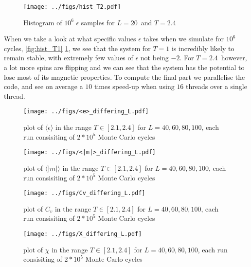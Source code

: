 \documentclass[english,notitlepage,reprint,nofootinbib]{revtex4-1}  %
\begin{document}
\begin{figure}[H]
	\centering
	\texttt{[image: ../figs/hist\_T2.pdf]} %
	\caption{Histogram of $10^6$ $\epsilon$ samples for $L=20$ and $T=2.4$}
	\label{fig:hist_T2}
\end{figure}

When we take a look at what specific values $\epsilon$ takes when we simulate for $10^6$ cycles, \ref{fig:hist_T1} \ref{fig:hist_T2}, we see that the system for $T=1$ is incredibly likely to remain stable, with extremely few values of $\epsilon$ not being $-2$. For $T=2.4$ however, a lot more spins are flipping and we can see that the system has the potential to lose most of its magnetic properties.
\newline
To compute the final part we parallelise the code, and see on average a $10$ times speed-up when using $16$ threads over a single thread.
\begin{figure}[H]
	\centering
	\texttt{[image: ../figs/<e>\_differing\_L.pdf]} %
	\caption{plot of $\langle\epsilon\rangle$ in the range $T \in [2.1,2.4]$ for $L=40,60,80,100$, each run consisiting of $2*10^5$ Monte Carlo cycles}
	\label{fig:e_differing}
\end{figure}

\begin{figure}[H]
	\centering
	\texttt{[image: ../figs/<|m|>\_differing\_L.pdf]} %
	\caption{plot of $\langle|m|\rangle$ in the range $T \in [2.1,2.4]$ for $L=40,60,80,100$, each run consisiting of $2*10^5$ Monte Carlo cycles}
	\label{fig:m_differing}
\end{figure}

\begin{figure}[H]
	\centering
	\texttt{[image: ../figs/Cv\_differing\_L.pdf]} %
	\caption{plot of $C_v$ in the range $T \in [2.1,2.4]$ for $L=40,60,80,100$, each run consisiting of $2*10^5$ Monte Carlo cycles}
	\label{fig:Cv_diff_l}
\end{figure}

\begin{figure}[H]
	\centering
	\texttt{[image: ../figs/X\_differing\_L.pdf]} %
	\caption{plot of $\chi$ in the range $T \in [2.1,2.4]$ for $L=40,60,80,100$, each run consisiting of $2*10^5$ Monte Carlo cycles}
	\label{fig:X_diff_l}
\end{figure}
\end{document}
